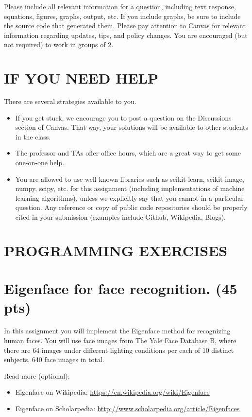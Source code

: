 \documentclass[10pt]{article}
\begin{document}
Please include all relevant information for a question, including text response, equations, figures, graphs, output, etc. If you include graphs, be sure to include the source code that generated them. Please pay attention to Canvas for relevant information regarding updates, tips, and policy changes. You are encouraged (but not required) to work in groups of 2.

\section{IF YOU NEED HELP}
There are several strategies available to you.

\begin{itemize}
  \item If you get stuck, we encourage you to post a question on the Discussions section of Canvas. That way, your solutions will be available to other students in the class.

  \item The professor and TAs offer office hours, which are a great way to get some one-on-one help.

  \item You are allowed to use well known libraries such as scikit-learn, scikit-image, numpy, scipy, etc. for this assignment (including implementations of machine learning algorithms), unless we explicitly say that you cannot in a particular question. Any reference or copy of public code repositories should be properly cited in your submission (examples include Github, Wikipedia, Blogs).

\end{itemize}

\section{PROGRAMMING EXERCISES}
\section{Eigenface for face recognition. (45 pts)}
In this assignment you will implement the Eigenface method for recognizing human faces. You will use face images from The Yale Face Database B, where there are 64 images under different lighting conditions per each of 10 distinct subjects, 640 face images in total.

Read more (optional):

\begin{itemize}
  \item Eigenface on Wikipedia: \href{https://en.wikipedia.org/wiki/Eigenface}{https://en.wikipedia.org/wiki/Eigenface}

  \item Eigenface on Scholarpedia: \href{http://www.scholarpedia.org/article/Eigenfaces}{http://www.scholarpedia.org/article/Eigenfaces}

\end{itemize}
\end{document}
